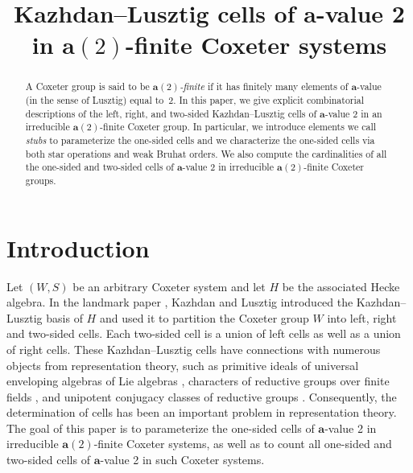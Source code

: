 \documentclass[ALCO,Unicode,published]{cedram}
\author[\initial{R.} \middlename{M.} Green]{\firstname{R.} \middlename{M.} \lastname{Green}}
\author[\initial{T.} Xu]{\firstname{Tianyuan} \lastname{Xu}}
\newcommand{\la}{\mathbf{a}}
\begin{document}
\title[Kazhdan--Lusztig cells of $\mathbf{a}$-value 2]{Kazhdan--Lusztig cells of $\mathbf{a}$-value 2 in $\mathbf{a}(2)$-finite Coxeter
systems}

\begin{abstract}
    A Coxeter group is said to be \emph{$\mathbf{a}(2)$-finite} if it has finitely many elements of
    $\mathbf{a}$-value (in the sense of Lusztig) equal to~2. In this paper, we give explicit combinatorial
    descriptions of the left, right, and two-sided Kazhdan--Lusztig cells of $\mathbf{a}$-value 2 in
    an irreducible $\mathbf{a}(2)$-finite Coxeter group. In particular, we introduce elements we
    call \emph{stubs} to parameterize the one-sided cells and we characterize the one-sided cells
    via both star operations and weak Bruhat orders.  We also compute the cardinalities of all the
    one-sided and two-sided cells of $\mathbf{a}$-value 2 in irreducible $\mathbf{a}(2)$-finite
Coxeter groups.\end{abstract} \maketitle

\section{Introduction}
Let $(W,S)$ be an arbitrary Coxeter system and let $H$ be the associated Hecke algebra.  In the
landmark paper \cite{KL}, Kazhdan and Lusztig introduced the Kazhdan--Lusztig basis of $H$ and used
it to partition the Coxeter group $W$ into left, right and two-sided cells. Each two-sided cell is a
union of left cells as well as a union of right cells. These {Kazhdan--Lusztig cells} have
connections with numerous objects from representation theory, such as primitive ideals of universal
enveloping algebras of Lie algebras \cite{primitiveIdeals}, characters of reductive groups over
finite fields \cite{LusztigReductive}, and unipotent conjugacy classes of reductive groups
\cite{LusztigCellIV}. Consequently, the determination of cells has been an important problem in
representation theory. The goal of this paper is to parameterize the one-sided cells of $\la$-value
2 in irreducible {$\la(2)$-finite} Coxeter systems, as well as to count all one-sided and two-sided
cells of $\la$-value 2 in such Coxeter systems. 
\end{document}
